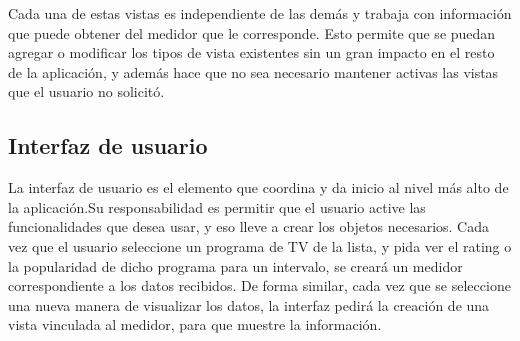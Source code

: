 Cada una de estas vistas es independiente de las demás y trabaja con información que puede obtener del medidor que le corresponde. Esto permite que se puedan agregar o modificar los tipos de vista existentes sin un gran impacto en el resto de la aplicación, y además hace que no sea necesario mantener activas las vistas que el usuario no solicitó.

\subsection{Interfaz de usuario}

La interfaz de usuario es el elemento que coordina y da inicio al nivel más alto de la aplicación.Su responsabilidad es permitir que el usuario active las funcionalidades que desea usar, y eso lleve a crear los objetos necesarios. Cada vez que el usuario seleccione un programa de TV de la lista, y pida ver el rating o la popularidad de dicho programa para un intervalo, se creará un medidor correspondiente a los datos recibidos. De forma similar, cada vez que se seleccione una nueva manera de visualizar los datos, la interfaz pedirá la creación de una vista vinculada al medidor, para que muestre la información.